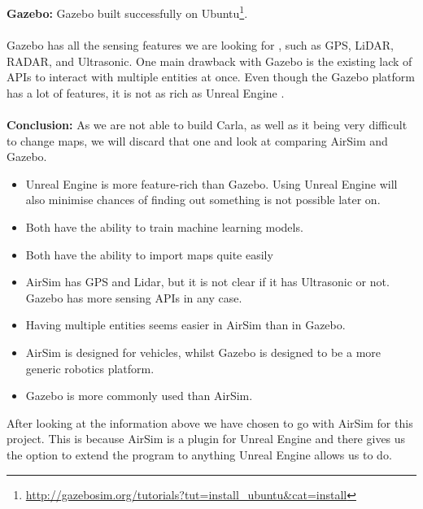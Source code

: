 \\~\\
\textbf{Gazebo:} Gazebo built successfully on Ubuntu\footnote{\url{http://gazebosim.org/tutorials?tut=install_ubuntu&cat=install}}.
\\~\\
Gazebo has all the sensing features we are looking for \cite{Rosique2019}, such as GPS, LiDAR, RADAR, and Ultrasonic. One main drawback with Gazebo is the existing lack of APIs to interact with multiple entities at once. Even though the Gazebo platform has a lot of features, it is not as rich as Unreal Engine \cite{EbeidEmad2018AsoO}. 
\\~\\

\textbf{Conclusion:} As we are not able to build Carla, as well as it being very difficult to change maps, we will discard that one and look at comparing AirSim and Gazebo. 
\begin{itemize}
    \item Unreal Engine is more feature-rich than Gazebo. Using Unreal Engine will also minimise chances of finding out something is not possible later on. 
    \item Both have the ability to train machine learning models.
    \item Both have the ability to import maps quite easily
    \item AirSim has GPS and Lidar, but it is not clear if it has Ultrasonic or not. Gazebo has more sensing APIs in any case.
    \item Having multiple entities seems easier in AirSim than in Gazebo. 
    \item AirSim is designed for vehicles, whilst Gazebo is designed to be a more generic robotics platform. 
    \item Gazebo is more commonly used than AirSim. 
\end{itemize}
After looking at the information above we have chosen to go with AirSim for this project. This is because AirSim is a plugin for Unreal Engine and there gives us the option to extend the program to anything Unreal Engine allows us to do. 